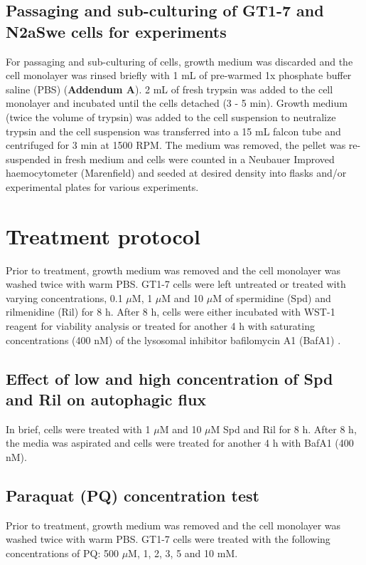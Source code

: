 \subsection{Passaging and sub-culturing of GT1-7 and N2aSwe cells for experiments}\label{sec:Passaging_sub-culturing_GT1-7_N2aSwe_experiments}
For passaging and sub-culturing of cells, growth medium was discarded and the cell monolayer was rinsed briefly with 1 mL of pre-warmed 1x phosphate buffer saline (PBS) (\textbf{Addendum A}). 2 mL of fresh trypsin was added to the cell monolayer and incubated until the cells detached (3 - 5 min). Growth medium (twice the volume of trypsin) was added to the cell suspension to neutralize trypsin and the cell suspension was transferred into a 15 mL falcon tube and centrifuged for 3 min at 1500 RPM. The medium was removed, the pellet was re-suspended in fresh medium and cells were counted in a Neubauer Improved haemocytometer (Marenfield) and seeded at desired density into flasks and/or experimental plates for various experiments.

\section{Treatment protocol}
Prior to treatment, growth medium was removed and the cell monolayer was washed twice with warm PBS. GT1-7 cells were left untreated or treated with varying concentrations, 0.1 $\mu$M, 1 $\mu$M and 10 $\mu$M of spermidine (Spd) and rilmenidine (Ril) for 8 h. After 8 h, cells were either incubated with WST-1 reagent for viability analysis or treated for another 4 h with saturating concentrations (400 nM) of the lysosomal inhibitor bafilomycin A1 (BafA1) \citep{DuToit2018b,loos2014}.

\subsection{Effect of low and high concentration of Spd and Ril on autophagic flux}\label{sec:Effect_low_high_Spd_Ril_autophagic flux}
In brief, cells were treated with 1 $\mu$M and 10 $\mu$M Spd and Ril for 8 h. After 8 h, the media was aspirated and cells were treated for another 4 h with BafA1 (400 nM).

\subsection{Paraquat (PQ) concentration test}
Prior to treatment, growth medium was removed and the cell monolayer was washed twice with warm PBS. GT1-7 cells were treated with the following concentrations of PQ: 500 $\mu$M, 1, 2, 3, 5 and 10 mM. 

